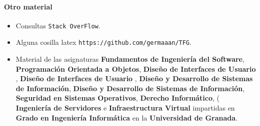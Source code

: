 \documentclass[a4paper,11pt]{book}
\begin{document}
\begin{thebibliography}{99}
\bigskip
\subsubsection*{Otro material}
\begin{itemize}
	\item Consultas {\tt Stack OverFlow}.
	\item Alguna cosilla latex {\tt https://github.com/germaaan/TFG}.
	\item Material de las asignaturas \textbf{Fundamentos de Ingeniería del Software}, \textbf{Programación Orientada a Objetos}, \textbf{Diseño de Interfaces de Usuario  }, \textbf{Diseño de Interfaces de Usuario  }, \textbf{Diseño y Desarrollo de Sistemas de Información}, \textbf{Diseño y Desarrollo de Sistemas de Información}, \textbf{Seguridad en Sistemas Operativos}, \textbf{Derecho Informático},  ( \textbf{Ingeniería de Servidores} e \textbf{Infraestructura Virtual} impartidas en \textbf{Grado en Ingeniería Informática} en la \textbf{Universidad de Granada}.
\end{itemize}
\end{thebibliography}


%
%
%
%
%
%
\chapter*{}

\thispagestyle{empty}
\end{document}
